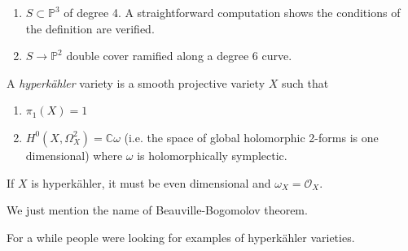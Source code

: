 \begin{example}[K3 surfaces]
\label{example-K3-surfaces}
\begin{enumerate}
\item $S\subset \mathbb{P}^3$ of degree 4. A
straightforward computation shows
the conditions of the definition are
verified.
\item $S \to \mathbb{P}^2$ double cover
ramified along a degree 6 curve.
\end{enumerate}
\end{example}

\begin{definition}
\label{definition-hyperkahler-variety}
A {\it hyperk\"ahler} variety is a smooth
projective variety $X$ such that
\begin{enumerate}
\item $\pi_{1}(X)=1$
\item $H^{0}(X,\Omega_X^2)=\mathbb{C} \omega$
(i.e. the space of global
holomorphic 2-forms is one dimensional) where
$\omega$ is holomorphically symplectic.
\end{enumerate}
\end{definition}

\begin{remark}
\label{remark-hyperkahler}
If $X$ is hyperk\"ahler, it must be even
dimensional and $\omega_X=\mathcal{O}_X$.
\end{remark}

\begin{remark}
\label{remark-Beauville-Bogomolov}
We just mention the name of
Beauville-Bogomolov theorem.
\end{remark}

For a while people were looking for examples
of hyperk\"ahler varieties.

